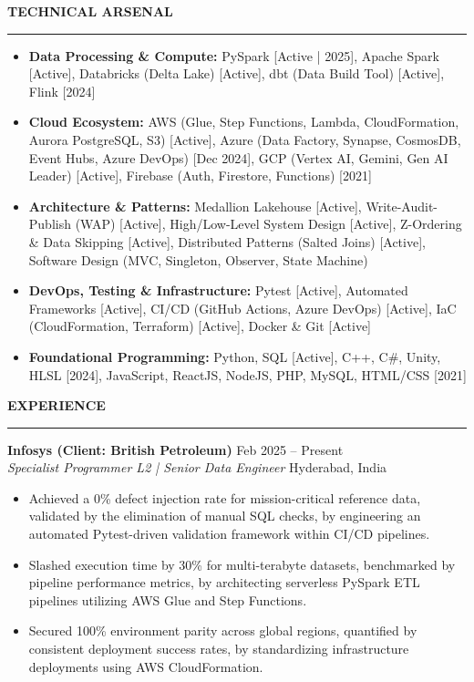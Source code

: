 \documentclass[10pt, letterpaper]{article}
\newcommand{\resumesection}[1]{
  \vspace{8pt}
  \noindent \textbf{\large \uppercase{#1}} \\
  \vspace{-8pt}
  \hrule
  \vspace{6pt}
}
\begin{document}
\resumesection{Technical Arsenal}
\begin{itemize}
    \setlength{\itemsep}{1pt}
    \item \textbf{Data Processing \& Compute:} PySpark [Active | 2025], Apache Spark [Active], Databricks (Delta Lake) [Active], dbt (Data Build Tool) [Active], Flink [2024]
    \item \textbf{Cloud Ecosystem:} AWS (Glue, Step Functions, Lambda, CloudFormation, Aurora PostgreSQL, S3) [Active], Azure (Data Factory, Synapse, CosmosDB, Event Hubs, Azure DevOps) [Dec 2024], GCP (Vertex AI, Gemini, Gen AI Leader) [Active], Firebase (Auth, Firestore, Functions) [2021]
    \item \textbf{Architecture \& Patterns:} Medallion Lakehouse [Active], Write-Audit-Publish (WAP) [Active], High/Low-Level System Design [Active], Z-Ordering \& Data Skipping [Active], Distributed Patterns (Salted Joins) [Active], Software Design (MVC, Singleton, Observer, State Machine)
    \item \textbf{DevOps, Testing \& Infrastructure:} Pytest [Active], Automated Frameworks [Active], CI/CD (GitHub Actions, Azure DevOps) [Active], IaC (CloudFormation, Terraform) [Active], Docker \& Git [Active]
    \item \textbf{Foundational Programming:} Python, SQL [Active], C++, C\#, Unity, HLSL [2024], JavaScript, ReactJS, NodeJS, PHP, MySQL, HTML/CSS [2021]
\end{itemize}

\resumesection{Experience}

\noindent \textbf{Infosys (Client: British Petroleum)} \hfill Feb 2025 -- Present \\
\textit{Specialist Programmer L2 | Senior Data Engineer} \hfill Hyderabad, India
\begin{itemize}
    \setlength{\itemsep}{1pt}
    \item Achieved a 0\% defect injection rate for mission-critical reference data, validated by the elimination of manual SQL checks, by engineering an automated Pytest-driven validation framework within CI/CD pipelines.
    \item Slashed execution time by 30\% for multi-terabyte datasets, benchmarked by pipeline performance metrics, by architecting serverless PySpark ETL pipelines utilizing AWS Glue and Step Functions.
    \item Secured 100\% environment parity across global regions, quantified by consistent deployment success rates, by standardizing infrastructure deployments using AWS CloudFormation.
\end{itemize}
\end{document}

